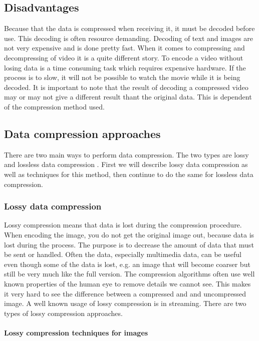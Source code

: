\subsection{Disadvantages}
Because that the data is compressed when receiving it, it must be decoded before use. This decoding is often resource demanding. Decoding of text and images are not very expensive and is done pretty fast.  When it comes to compressing and decompressing of video it is a quite different story. To encode a video without losing data is a time consuming task which requires expensive hardware. If the process is to slow, it will not be possible to watch the movie while it is being decoded. It is important to note that the result of decoding a compressed video may or may not give a different result thant the original data. This is dependent of the compression method used.

\pagebreak

\subsection{Data compression approaches}
There are two main ways to perform data compression. The two types are lossy and lossless data compression \cite{bib:dataCompression}. First we will describe lossy data compression as well as techniques for this method, then continue to do the same for lossless data compression.

\subsubsection{Lossy data compression}
Lossy compression means that data is lost during the compression procedure. When encoding the image, you do not get the original image out, because data is lost during the process. The purpose is to decrease the amount of data that must be sent or handled. Often the data, especially multimedia data, can be useful even though some of the data is lost, e.g. an image that will become coarser but still be very much like the full version. The compression algorithms often use well known properties of the human eye to remove details we cannot see. This makes it very hard to see the difference between a compressed and and uncompressed image. A well known usage of lossy compression is in streaming. There are two types of lossy compression approaches. \cite{bib:lossyCompression}

\paragraph{Lossy compression techniques for images}

